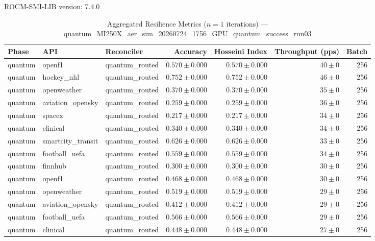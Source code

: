 ROCM-SMI-LIB version: 7.4.0

\begin{table}[htbp]
\caption{Aggregated Resilience Metrics ($n=1$ iterations) --- quantum_MI250X_aer_sim_20260724_1756_GPU_quantum_success_run03}
\begin{tabular}{l l l r r r r}
\hline
Phase & API & Reconciler & Accuracy & Hosseini Index & Throughput (pps) & Batch \\
\hline
quantum & openf1 & quantum\_routed & $0.570\pm0.000$ & $0.570\pm0.000$ & $40\pm0$ & 256 \\
quantum & hockey\_nhl & quantum\_routed & $0.752\pm0.000$ & $0.752\pm0.000$ & $46\pm0$ & 256 \\
quantum & openweather & quantum\_routed & $0.370\pm0.000$ & $0.370\pm0.000$ & $35\pm0$ & 256 \\
quantum & aviation\_opensky & quantum\_routed & $0.259\pm0.000$ & $0.259\pm0.000$ & $36\pm0$ & 256 \\
quantum & spacex & quantum\_routed & $0.217\pm0.000$ & $0.217\pm0.000$ & $34\pm0$ & 256 \\
quantum & clinical & quantum\_routed & $0.340\pm0.000$ & $0.340\pm0.000$ & $34\pm0$ & 256 \\
quantum & smartcity\_transit & quantum\_routed & $0.626\pm0.000$ & $0.626\pm0.000$ & $33\pm0$ & 256 \\
quantum & football\_uefa & quantum\_routed & $0.559\pm0.000$ & $0.559\pm0.000$ & $34\pm0$ & 256 \\
quantum & finnhub & quantum\_routed & $0.300\pm0.000$ & $0.300\pm0.000$ & $30\pm0$ & 256 \\
quantum & openf1 & quantum\_routed & $0.468\pm0.000$ & $0.468\pm0.000$ & $30\pm0$ & 256 \\
quantum & openweather & quantum\_routed & $0.519\pm0.000$ & $0.519\pm0.000$ & $29\pm0$ & 256 \\
quantum & aviation\_opensky & quantum\_routed & $0.412\pm0.000$ & $0.412\pm0.000$ & $29\pm0$ & 256 \\
quantum & football\_uefa & quantum\_routed & $0.566\pm0.000$ & $0.566\pm0.000$ & $29\pm0$ & 256 \\
quantum & clinical & quantum\_routed & $0.448\pm0.000$ & $0.448\pm0.000$ & $27\pm0$ & 256 \\

\end{tabular}
\end{table}
